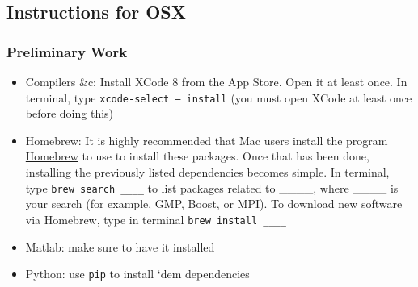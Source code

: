 
\subsection{Instructions for OSX}


\subsubsection{Preliminary Work}
\begin{itemize}
  \item Compilers \&c: Install XCode 8 from the App Store.  Open it at least once.  In terminal, type {\tt xcode-select -- install} (you must open XCode at least once before doing this)
   
  \item Homebrew: It is highly recommended that Mac users install the program \href{http://brew.sh}{Homebrew} to use to install these packages. Once that has been done, installing the previously listed dependencies becomes simple. In terminal,  type \texttt{brew search \_\_\_\_} to list packages related to \_\_\_\_, where \_\_\_\_ is your search (for example, GMP, Boost, or MPI). To download new software via Homebrew, type in terminal \texttt{brew install \_\_\_\_} 
   \item Matlab: make sure to have it installed
   \item Python: use {\tt pip} to install `dem dependencies
\end{itemize}


